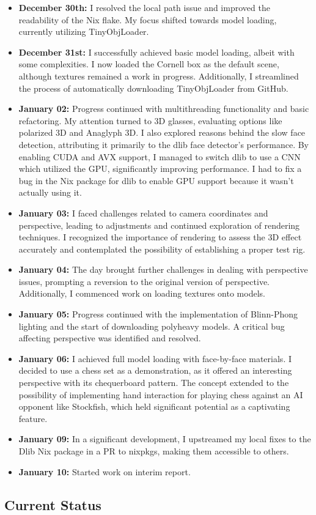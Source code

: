 \begin{itemize}
    \item \textbf{December 30th:} I resolved the local path issue and improved the readability of the Nix flake. My focus shifted towards model loading, currently utilizing TinyObjLoader.

    \item \textbf{December 31st:} I successfully achieved basic model loading, albeit with some complexities. I now loaded the Cornell box as the default scene, although textures remained a work in progress. Additionally, I streamlined the process of automatically downloading TinyObjLoader from GitHub.

    \item \textbf{January 02:} Progress continued with multithreading functionality and basic refactoring. My attention turned to 3D glasses, evaluating options like polarized 3D and Anaglyph 3D. I also explored reasons behind the slow face detection, attributing it primarily to the dlib face detector's performance. By enabling CUDA and AVX support, I managed to switch dlib to use a CNN which utilized the GPU, significantly improving performance. I had to fix a bug in the Nix package for dlib to enable GPU support because it wasn't actually using it.
    
    \item \textbf{January 03:} I faced challenges related to camera coordinates and perspective, leading to adjustments and continued exploration of rendering techniques. I recognized the importance of rendering to assess the 3D effect accurately and contemplated the possibility of establishing a proper test rig.

    \item \textbf{January 04:} The day brought further challenges in dealing with perspective issues, prompting a reversion to the original version of perspective. Additionally, I commenced work on loading textures onto models.

    \item \textbf{January 05:} Progress continued with the implementation of Blinn-Phong lighting and the start of downloading polyheavy models. A critical bug affecting perspective was identified and resolved.

    \item \textbf{January 06:} I achieved full model loading with face-by-face materials. I decided to use a chess set as a demonstration, as it offered an interesting perspective with its chequerboard pattern. The concept extended to the possibility of implementing hand interaction for playing chess against an AI opponent like Stockfish, which held significant potential as a captivating feature.

    \item \textbf{January 09:} In a significant development, I upstreamed my local fixes to the Dlib Nix package in a PR to nixpkgs, making them accessible to others.
    
    \item \textbf{January 10:} Started work on interim report. 
\end{itemize}

\subsection{Current Status}